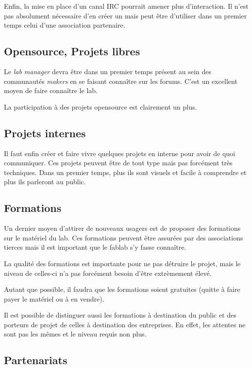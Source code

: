 Enfin, la mise en place d'un canal IRC pourrait amener plus d'interaction. Il n'est pas absolument nécessaire d'en créer un
mais peut être d'utiliser dans un premier temps celui d'une association partenaire.

\subsection{Opensource, Projets libres}

Le \textit{lab manager} devra être dans un premier temps présent au sein des communautés \textit{makers} en se faisant connaître sur
les forums. C'est un excellent moyen de faire connaître le lab.

La participation à des projets opensource est clairement un plus.

\subsection{Projets internes}

Il faut enfin créer et faire vivre quelques projets en interne pour avoir de quoi communiquer. Ces projets peuvent être
de tout type mais pas forcément très techniques. Dans un premier temps, plus ils sont visuels et facile à comprendre et
plus ils parleront au public.

\subsection{Formations}

Un dernier moyen d'attirer de nouveaux usagers est de proposer des formations sur le matériel du lab. Ces formations
peuvent être assurées par des associations tierces mais il est important que le fablab s'y fasse connaître.

La qualité des formations est importante pour ne pas détruire le projet, mais le niveau de celles-ci n'a pas forcément
besoin d'être extrèmement élevé.

Autant que possible, il faudra que les formations soient gratuites (quitte à faire payer le matériel ou à en vendre).

Il est possible de distinguer aussi les formations à destination du public et des porteurs de projet de celles à
destination des entreprises. En effet, les attentes ne sont pas les mêmes et le niveau requis non plus.

\subsection{Partenariats}

